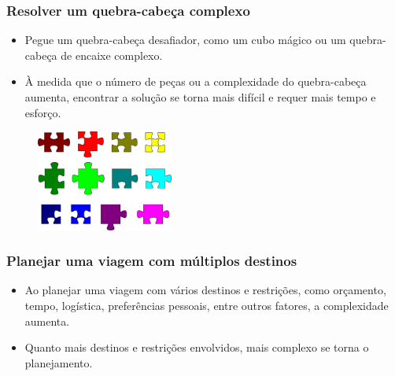 \documentclass[12pt]{beamer}
\begin{document}
\begin{frame}
    \frametitle{Resolver um quebra-cabeça complexo}

    \begin{itemize}
        \item Pegue um quebra-cabeça desafiador, como um cubo mágico ou um quebra-cabeça de encaixe complexo.
        \item À medida que o número de peças ou a complexidade do quebra-cabeça aumenta, encontrar a solução se torna mais difícil e requer mais tempo e esforço.
    \end{itemize}

    \begin{figure}[htb]
        \centering
        \includegraphics[width=0.4\textwidth]{quebracabeca}
        \label{fig:quebracabeca}
    \end{figure}
\end{frame}

\begin{frame}
    \frametitle{Planejar uma viagem com múltiplos destinos}
    \begin{itemize}
        \item Ao planejar uma viagem com vários destinos e restrições, como orçamento, tempo, logística, preferências pessoais, entre outros fatores, a complexidade aumenta.
        \item Quanto mais destinos e restrições envolvidos, mais complexo se torna o planejamento.
    \end{itemize}
\end{frame}
\end{document}
